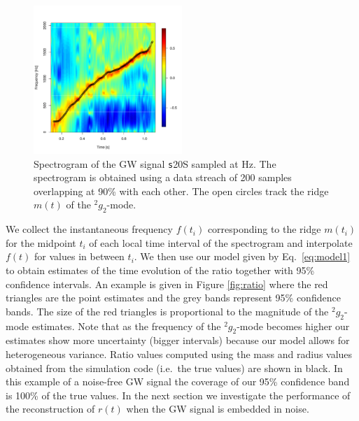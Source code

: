 \begin{figure}
 \centering
 \includegraphics[width=0.5\textwidth]{plots/spectrogram}
 \caption{Spectrogram of the GW signal {\texttt s20S} sampled at \unit[4096]{Hz}.
   The spectrogram is obtained using a data streach of 200 samples overlapping at 90\%
   with each other. The open circles track the ridge $m(t) $ of the $\mbox{}^2 g_2$-mode. } \label{fig:spectrogram}
\end{figure}

We collect the instantaneous frequency $f(t_i)$ corresponding to the ridge $m(t_i)$ for
the midpoint $t_i$ of each local time interval of the spectrogram and interpolate $f(t)$
for values in between $t_i$. We then use our model given by Eq.~\eqref{eq:model1} to obtain
estimates of the time evolution of the ratio together with 95\% confidence intervals.
An example is given in Figure \ref{fig:ratio} where the red triangles are the point estimates and
the grey bands represent 95\% confidence bands. The size of the red triangles is proportional to the magnitude of the $\mbox{}^2 g_2$-mode estimates.  Note that as the frequency of the $\mbox{}^2 g_2$-mode becomes higher our estimates show more uncertainty (bigger intervals) because our model allows for heterogeneous variance. Ratio values
computed using the mass and radius values obtained from the simulation code (i.e.~the true values)
are shown in black. In this example of a noise-free GW signal the coverage of our 95\% confidence band is 100\%
of the true values. In the next section we investigate the performance of the reconstruction of $r(t)$ when the GW
signal is embedded in noise. 

